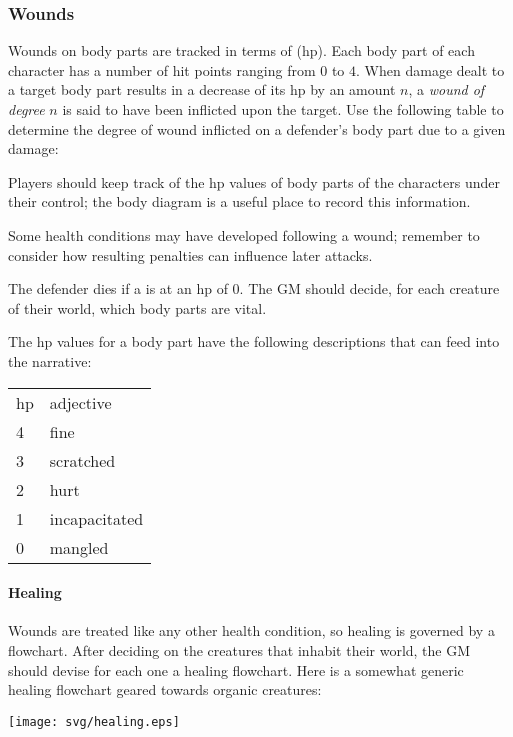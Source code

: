 \subsubsection{Wounds}\label{sec:wounds}

Wounds on body parts are tracked in terms of  (hp).
Each body part of each character has a number of hit points ranging from
$0$ to $4$.
When damage dealt to a target body part results in a decrease of its hp by an amount $n$, 
a \emph{wound of degree}
$n$ is said to have been inflicted upon the target.
Use the following table to determine the degree of wound inflicted on a defender's body part
due to a given damage:
\begin{center}

\end{center}
Players should keep track of the hp values of body parts of the characters under their control;
the body diagram is a useful place to record this information.

Some health conditions may have developed following a wound;
remember to consider how resulting penalties can influence later attacks.

The defender dies if a  is at an hp of $0$.
The GM should decide, for each creature of their world, which body parts are vital.

The hp values for a body part have the following descriptions that can feed into the narrative:
\begin{center}
{\setlength{\extrarowheight}{1pt}
\begin{tabular}{l|l}
hp & adjective \\
\cline{1-2}
4  & fine \\
3  & scratched \\
2  & hurt \\
1  & incapacitated \\
0  & mangled
\end{tabular}}
\end{center}

\paragraph{Healing} Wounds are treated like any other health condition, so healing
is governed by a flowchart.
After deciding on the creatures that inhabit their world, the GM should devise for each one a healing flowchart.
Here is a somewhat generic healing flowchart geared towards organic creatures:
\begin{center} \texttt{[image: svg/healing.eps]} \end{center}
